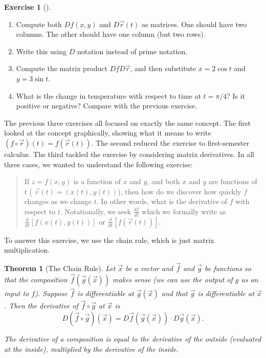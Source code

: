 \documentclass[10pt,]{book}
\theoremstyle{plain}
\newtheorem{theorem}{Theorem}[section]
\theoremstyle{definition}
\theoremstyle{definition}
\theoremstyle{definition}
\theoremstyle{definition}
\newtheorem{exploration}[project]{Exercise}
\theoremstyle{definition}
\numberwithin{equation}{section}
\newcommand{\ds}{\displaystyle}
\begin{document}
\begin{exploration}[]\label{exploration-153}
\leavevmode%
\begin{enumerate}[font=\bfseries,label=(\alph*),ref=\alph*]
\item\label{task-353} Compute both \(Df(x,y)\) and \(D\vec r(t)\) as matrices. One should have two columns.  The other should have one column (but two rows).%
\item\label{task-354} Write this using \(D\) notation instead of prime notation.%
\item\label{task-355} Compute the matrix product \(DfD\vec r\), and then substitute \(x=2\cos t\) and \(y=3\sin t\).%
\item\label{task-356} What is the change in temperature with respect to time at \(t=\pi/4\)? Is it positive or negative? Compare with the previous exercise.%
\end{enumerate}
\end{exploration}
The previous three exercises all focused on exactly the same concept. The first looked at the concept graphically, showing what it means to write \((f\circ \vec r)(t)=f(\vec r(t))\). The second reduced the exercise to first-semester calculus. The third tackled the exercise by considering matrix derivatives. In all three cases, we wanted to understand the following exercise:%
\begin{quote}\hypertarget{blockquote-3}{}
If \(z=f(x,y)\) is a function of \(x\) and \(y\), and both \(x\) and \(y\) are functions of \(t\) ( \(\vec r(t)=(x(t),y(t))\)), then how do we discover how quickly \(f\) changes as we change \(t\). In other words, what is the derivative of \(f\) with respect to \(t\). Notationally, we seek \(\ds \frac{df}{dt}\) which we formally write as \(\ds \frac{d}{dt}[f(x(t),y(t))]\) or \(\ds \frac{d}{dt} [f(\vec r(t))].\)\end{quote}
To answer this exercise, we use the chain rule, which is just matrix multiplication.%
\begin{theorem}[{The Chain Rule}]\label{def_chain_rule}
Let \(\vec x\) be a vector and \(\vec f\) and \(\vec g\) be functions so that the composition \(\vec f(\vec g(\vec x))\) makes sense (we can use the output of \(g\) as an input to \(f\)). Suppose \(\vec f\) is differentiable at \(\vec g(\vec x)\) and that \(\vec g\) is differentiable at \(\vec x\). Then the derivative of \(\vec f\circ \vec g\) at \(\vec x\) is%
\begin{equation*}
D(\vec f\circ \vec g)(\vec x) = D\vec f(\vec g(\vec x))\cdot D\vec g(\vec x).
\end{equation*}
%
\par
The derivative of a composition is equal to the derivative of the outside (evaluated at the inside), multiplied by the derivative of the inside.%
\end{theorem}
\end{document}

